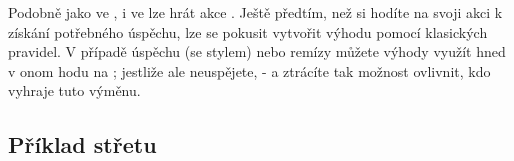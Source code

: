 \documentclass[../main.tex]{subfiles}
\begin{document}
Podobně jako ve , i ve  lze hrát akce . Ještě předtím, než si hodíte na svoji akci  k získání potřebného úspěchu, lze se pokusit vytvořit výhodu pomocí klasických pravidel. V případě úspěchu (se stylem) nebo remízy můžete výhody využít hned v onom hodu na ; jestliže ale neuspějete,   - a ztrácíte tak možnost ovlivnit, kdo vyhraje tuto výměnu.

\subsection{Příklad střetu}
\label{sec:příklad-střet}
\end{document}
